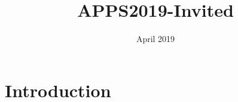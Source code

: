 \documentclass{article}
\title{APPS2019-Invited}
\author{ }
\date{April 2019}
\begin{document}
\maketitle

\section{Introduction}
\end{document}
